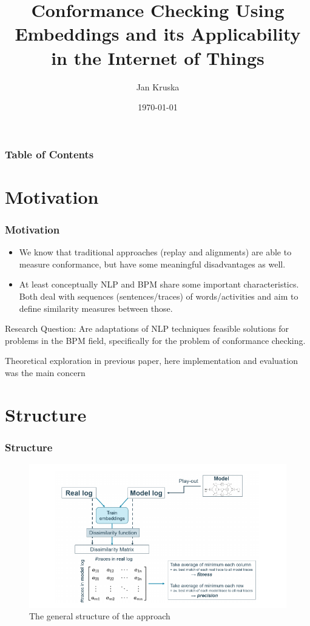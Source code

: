 \documentclass{beamer}
\title{Conformance Checking Using Embeddings and its Applicability in the Internet of Things}
\author{Jan Kruska}
\date{\today}
\begin{document}
	\beamertemplatenavigationsymbolsempty
	\frame{\titlepage}
	
	\begin{frame}
		\frametitle{Table of Contents}
		\tableofcontents
	\end{frame}
	\section{Motivation}
	\begin{frame}
		\frametitle{Motivation}
		\begin{itemize}
			\item We know that traditional approaches (replay and alignments) are able to measure conformance, but have some meaningful disadvantages as well.
			\item At least conceptually NLP and BPM share some important characteristics. Both deal with sequences (sentences/traces) of words/activities and aim to define similarity measures between those.
		\end{itemize}
		\begin{block}{Research Question:}
			Are adaptations of NLP techniques feasible solutions for problems in the BPM field, specifically for the problem of conformance checking.
		\end{block}
		\alert{Theoretical exploration in previous paper, here implementation and evaluation was the main concern}
	\end{frame}
	
	\section{Structure}
	\begin{frame}
		\frametitle{Structure}
		\begin{figure}
			\includegraphics[width=1\textwidth]{figures/structure}
			\caption{The general structure of the approach}
			\label{fig:structure}
		\end{figure}
	\end{frame}
	
\end{document}
